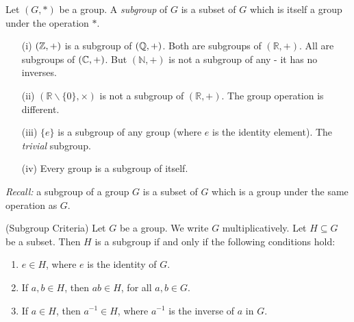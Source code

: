 \documentclass[10pt]{scrartcl}
\begin{document}
\vsp


\begin{definition} Let $(G,*)$ be a group. A \emph{subgroup} of $G$ is a subset of $G$ which is itself a group under the operation $*$.	
\end{definition}\vspace*{10pt}


\begin{examples}\begin{enumerate}
 \item[(i)] $(\mathbb{Z},+)$ is a subgroup of $(\mathbb{Q},+)$. Both are subgroups of $(\mathbb{R},+)$. All are subgroups of $(\mathbb{C},+)$. But $(\mathbb{N},+)$
 is not a subgroup of any - it has no inverses.
 \item[(ii)] $(\mathbb{R} \backslash\{0\},\times)$ is not a subgroup of $(\mathbb{R},+)$. The group operation is different.
 \item[(iii)] $\{e\}$ is a subgroup of any group (where $e$ is the identity element). The \emph{trivial} subgroup.
 \item[(iv)] Every group is a subgroup of itself.
  \end{enumerate}
  \end{examples}

\emph{Recall:}  
a subgroup of a group $G$ is a subset of $G$ which is a group under the same operation as $G$.\\

\begin{proposition} (Subgroup Criteria) Let $G$ be a group. We write $G$ multiplicatively. Let $H \subseteq G$ be a subset. Then $H$ is a subgroup if and only if the following conditions hold:\begin{enumerate}
\item $e \in H$, where $e$ is the identity of $G$.
\item If $a,b \in H$, then $ab \in H$, for all $a,b \in G$.
\item If $a \in H$, then $a^{-1} \in H$, where $a^{-1}$ is the inverse of $a$ in $G$.	
\end{enumerate}
\end{proposition}
\end{document}
